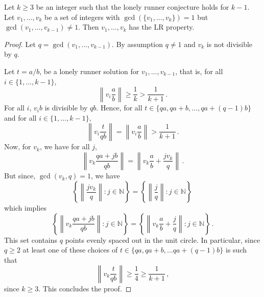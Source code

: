 \documentclass[10pt,a4paper]{amsart}
\begin{document}
\begin{lemma}\label{StrongerGCDCondition}
Let $k \geq 3$ be an integer such that the lonely runner conjecture holds for $k-1$. Let $v_1, \ldots, v_k$ be a set of integers with $\gcd(\{v_1, \ldots, v_k\})=1$ but $\gcd(v_1,\ldots, v_{k-1})\not=1$. Then $v_1, \ldots, v_k$ has the LR property.
\end{lemma}

\begin{proof}
Let $q=\gcd(v_1,\ldots, v_{k-1})$. By assumption $q\not=1$ and $v_k$ is not divisible by $q$.

Let $t=a/b$, be a lonely runner solution for $v_1,\ldots,v_{k-1}$, that is, for all $i\in \{1,\ldots, k-1\}$, 
\[
\left\|v_i\frac{a}{b}\right\|\ge \frac{1}{k}>\frac{1}{k+1}\,.
\]
For all $i$, $v_ib$ is divisible by $qb$. Hence, for all $t\in \{qa, qa+b,\ldots, qa+(q-1)b\}$ and for all $i\in \{1,\ldots, k-1\},$
\[
\left\|v_i\frac{t}{qb}\right\|=\left\|v_i\frac{a}{b}\right\|>\frac{1}{k+1}\,.
\]
Now, for $v_k$, we have for all $j$,
\[
\left\|v_k\frac{qa+jb}{qb}\right\|
=\left\|v_k\frac{a}{b} + \frac{jv_k}{q}\right\|\,.
\]
But since, $\gcd(v_k,q)=1$, we have 
\[
\left\{\left\|\frac{jv_k}{q}\right\|: j\in\mathbb{N}\right\}=  \left\{\left\|\frac{j}{q}\right\|: j\in\mathbb{N}\right\}\,
\]
which implies
\[
\left\{\left\|v_k\frac{qa+jb}{qb}\right\|: j\in\mathbb{N}\right\}
=\left\{\left\|v_k\frac{a}{b} + \frac{j}{q}\right\|: j\in\mathbb{N}\right\}\,.
\]
This set contains $q$ points evenly spaced out in the unit circle. In particular, since $q\ge2$ 
at least one of these choices of $t\in \{qa, qa+b,\ldots qa+(q-1)b\}$ is such that
\[
\left\|v_k\frac{t}{qb}\right\|\ge\frac{1}{4}\ge\frac{1}{k+1}\,,
\]
since $k\ge3$. This concludes the proof.
\end{proof}
\end{document}
